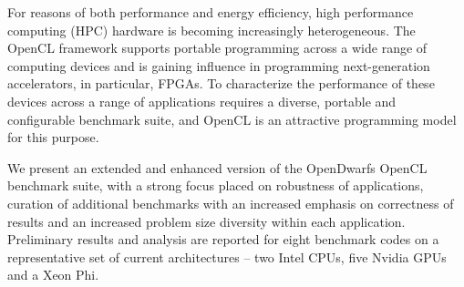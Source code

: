 \documentclass[../document.tex]{subfiles}
\begin{document}
For reasons of both performance and energy efficiency, high performance computing (HPC) hardware is becoming increasingly heterogeneous.
The OpenCL framework supports portable programming across a wide range of computing devices and is gaining influence in programming next-generation accelerators, in particular, FPGAs.
To characterize the performance of these devices across a range of applications requires a diverse, portable and configurable benchmark suite, and OpenCL is an attractive programming model for this purpose.


We present an extended and enhanced version of the OpenDwarfs OpenCL benchmark suite, with a strong focus placed on robustness of applications, curation of additional benchmarks with an increased emphasis on correctness of results and an increased problem size diversity within each application.
Preliminary results and analysis are reported for eight benchmark codes on a representative set of current architectures -- two Intel CPUs, five Nvidia GPUs and a Xeon Phi.



\end{document}
